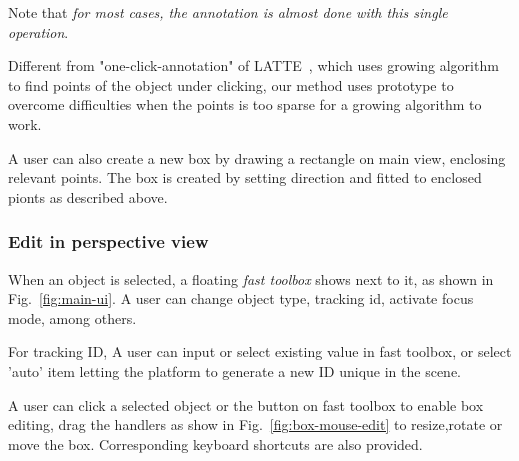\documentclass[letterpaper, 10 pt, conference]{ieeeconf}  %
\begin{document}
Note that \emph{for most cases, the annotation is almost done with this single operation}.

Different from "one-click-annotation" of LATTE~\cite{pointatme}, which uses growing algorithm to find points of the object under clicking, our method uses prototype to overcome difficulties when the points is too sparse for a growing algorithm to work.

A user can also create a new box by drawing a rectangle on main view,  enclosing relevant points. The box is created by setting direction  and fitted to enclosed pionts as described above.


\subsubsection{Edit in perspective view}

When an object is selected, a floating \emph{fast toolbox} shows next to it, as shown in Fig.~\ref{fig:main-ui}. A user can change object type, tracking id, activate focus mode, among others.

For tracking ID, A user  can input or select existing value in fast toolbox, or select 'auto' item  letting the platform to generate a new ID unique in the scene.


A user can click a selected object or the button on fast toolbox to enable box editing, drag the handlers as show in Fig.~\ref{fig:box-mouse-edit} to resize,rotate or move the box. Corresponding keyboard shortcuts are also provided.
 
\end{document}
